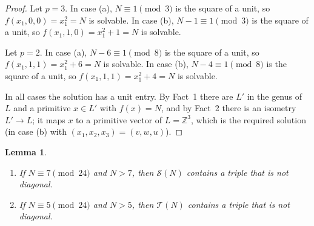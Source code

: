 \documentclass[11pt]{amsart}
\newtheorem{lemma}[theorem]{Lemma}
\theoremstyle{definition}
\theoremstyle{remark}
\newcommand{\Z}{\mathbb{Z}}
\newcommand{\cS}{\mathcal{S}}
\newcommand{\cT}{\mathcal{T}}
\begin{document}
\begin{proof}
Let $p=3$. In case (a), $N\equiv 1\pmod 3$ is the square of a unit, so $f(x_1,0,0)=x_1^2=N$ is solvable.
In case (b), $N-1\equiv 1\pmod 3$ is the square of a unit, so $f(x_1,1,0)=x_1^2+1=N$ is solvable.

Let $p=2$. In case (a), $N-6\equiv 1\pmod 8$ is the square of a unit, so $f(x_1,1,1)=x_1^2+6=N$ is solvable.
In case (b), $N-4\equiv 1\pmod 8$ is the square of a unit, so $f(x_1,1,1)=x_1^2+4=N$ is solvable.

In all cases the solution has a unit entry. By Fact~1 there are $L'$ in the genus of $L$ and a primitive $x\in L'$ with $f(x)=N$,
and by Fact~2 there is an isometry $L'\to L$; it maps $x$ to a primitive vector of $L=\Z^3$, which is the required solution
(in case (b) with $(x_1,x_2,x_3)=(v,w,u)$).
\end{proof}

\begin{lemma}\label{lem:seed}
\begin{enumerate}
\item[(a)] If $N\equiv 7\pmod{24}$ and $N>7$, then $\cS(N)$ contains a triple that is not diagonal.
\item[(b)] If $N\equiv 5\pmod{24}$ and $N>5$, then $\cT(N)$ contains a triple that is not diagonal.
\end{enumerate}
\end{lemma}
\end{document}
